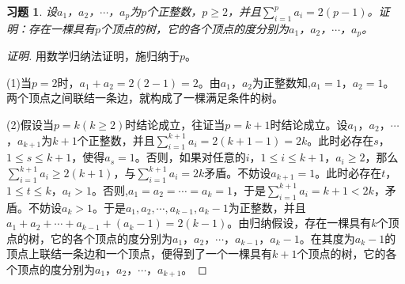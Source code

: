 \documentclass{article}
\begin{document}
\begin{CJK}{UTF8}{gbsn}
\newtheorem*{Exercise}{习题}
\begin{Exercise}
  设$a_1$，$a_2$，$\cdots$，$a_p$为$p$个正整数，$p\geq 2$，并且$\sum_{i=1}^pa_i=2(p-1)$。证明：存在一棵具有$p$个顶点的树，它的各个顶点的度分别为$a_1$，$a_2$，$\cdots$，$a_p$。
\end{Exercise}
\begin{proof}[证明]  用数学归纳法证明，施归纳于$p$。

  (1)当$p=2$时，$a_1+a_2=2(2-1)=2$。由$a_1$，$a_2$为正整数知,$a_1=1$，$a_2=1$。两个顶点之间联结一条边，就构成了一棵满足条件的树。

  (2)假设当$p=k(k\geq 2)$时结论成立，往证当$p=k+1$时结论成立。设$a_1$，$a_2$，$\cdots$，$a_{k+1}$为$k+1$个正整数，并且$\sum_{i=1}^{k+1}a_i=2(k+1-1)=2k$。此时必存在$s$，$1\leq s \leq k+1$，使得$a_s=1$。否则，如果对任意的$i$，$1\leq i \leq k+1$，$a_i\geq 2$，那么$\sum_{i=1}^{k+1}a_i\geq 2(k+1)$，与$\sum_{i=1}^{k+1}a_i=2k$矛盾。不妨设$a_{k+1}=1$。此时必存在$t$，$1\leq t \leq k$，$a_t>1$。否则,$a_1=a_2=\cdots=a_k=1$，于是$\sum_{i=1}^{k+1}a_i=k+1<2k$，矛盾。不妨设$a_k>1$。于是$a_1,a_2,\cdots,a_{k-1},a_{k}-1$为正整数，并且$a_1 + a_2 + \cdots + a_{k-1} + (a_{k}-1) = 2(k-1)$。由归纳假设，存在一棵具有$k$个顶点的树，它的各个顶点的度分别为$a_1$，$a_2$，$\cdots$，$a_{k-1}$，$a_k-1$。在其度为$a_k-1$的顶点上联结一条边和一个顶点，便得到了一个一棵具有$k+1$个顶点的树，它的各个顶点的度分别为$a_1$，$a_2$，$\cdots$，$a_{k+1}$。
\end{proof}

\end{CJK}
\end{document}
